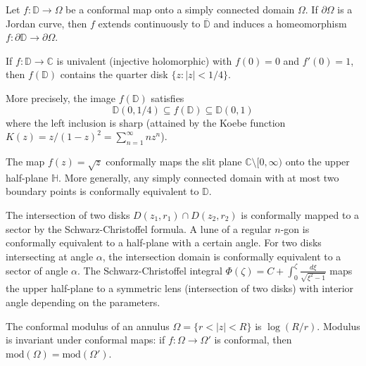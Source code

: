 \begin{theorem}
Let $f: \mathbb{D} \to \Omega$ be a conformal map onto a simply connected domain $\Omega$. If $\partial\Omega$ is a Jordan curve, then $f$ extends continuously to $\overline{\mathbb{D}}$ and induces a homeomorphism $f: \partial\mathbb{D} \to \partial\Omega$.
\end{theorem}

\begin{theorem}
If $f: \mathbb{D} \to \mathbb{C}$ is univalent (injective holomorphic) with $f(0) = 0$ and $f'(0) = 1$, then $f(\mathbb{D})$ contains the quarter disk $\{z : |z| < 1/4\}$.

More precisely, the image $f(\mathbb{D})$ satisfies
\[
\mathbb{D}(0, 1/4) \subseteq f(\mathbb{D}) \subseteq \mathbb{D}(0, 1)
\]
where the left inclusion is sharp (attained by the Koebe function $K(z) = z/(1-z)^2 = \sum_{n=1}^\infty n z^n$).
\end{theorem}

\begin{example}
The map $f(z) = \sqrt{z}$ conformally maps the slit plane $\mathbb{C} \setminus [0,\infty)$ onto the upper half-plane $\mathbb{H}$. More generally, any simply connected domain with at most two boundary points is conformally equivalent to $\mathbb{D}$.
\end{example}

\begin{example}
The intersection of two disks $D(z_1, r_1) \cap D(z_2, r_2)$ is conformally mapped to a sector by the Schwarz-Christoffel formula. A lune of a regular $n$-gon is conformally equivalent to a half-plane with a certain angle. For two disks intersecting at angle $\alpha$, the intersection domain is conformally equivalent to a sector of angle $\alpha$. The Schwarz-Christoffel integral $\Phi(\zeta) = C + \int_0^\zeta \frac{d\xi}{\sqrt{\xi^2 - 1}}$ maps the upper half-plane to a symmetric lens (intersection of two disks) with interior angle depending on the parameters.
\end{example}

\begin{example}
The conformal modulus of an annulus $\Omega = \{r < |z| < R\}$ is $\log(R/r)$. Modulus is invariant under conformal maps: if $f: \Omega \to \Omega'$ is conformal, then $\mathrm{mod}(\Omega) = \mathrm{mod}(\Omega')$.
\end{example}

